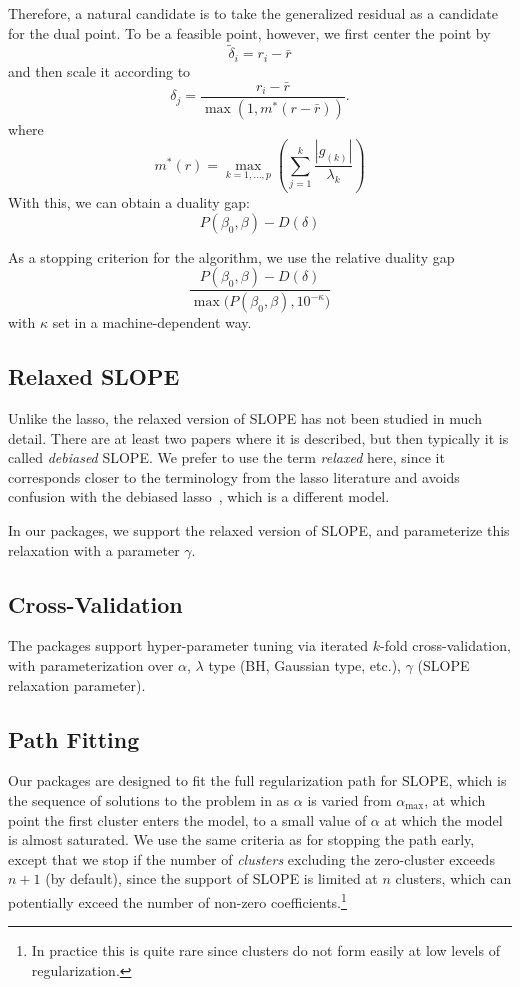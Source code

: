 \documentclass[article]{jss}
\let\Cref\crtCref
\begin{document}
Therefore, a natural candidate is to take the generalized residual as
a candidate for the dual point. To be a feasible point, however, we first
center the point by
\[
  \tilde{\delta}_i  = r_i - \bar{r}
\]
and then scale it according to
\[
  \delta_j = \frac{r_i - \bar{r}}{\max\left(1, m^*(r - \bar{r}) \right)}.
\]
where
\[
  m^*(r) = \max_{k=1,\ldots,p} \left(\sum_{j = 1}^k \frac{|g_{(k)}|}{\lambda_k} \right)
\]
With this, we can obtain a duality gap:
\[
  P(\beta_0, \beta) - D(\delta)
\]

As a stopping criterion for the algorithm, we use the relative duality gap
\[
  \frac{P(\beta_0, \beta) - D(\delta)}{\max\big(P(\beta_0, \beta), 10^{-\kappa}\big)}
\]
with \(\kappa\) set in a machine-dependent way.

\subsection{Relaxed SLOPE}

Unlike the lasso, the relaxed version of SLOPE has not been studied in much detail.
There are at least two papers where it is described, but then typically it is
called \emph{debiased} SLOPE. We prefer to use the term \emph{relaxed} here,
since it corresponds closer to the terminology from the lasso literature and
avoids confusion with the debiased lasso~\citep{geer2014}, which is a different
model.

In our packages, we support the relaxed version of SLOPE, and parameterize
this relaxation with a parameter \(\gamma\).

\subsection{Cross-Validation}

The packages support hyper-parameter tuning via iterated \(k\)-fold
cross-validation, with parameterization over \(\alpha\), \(\lambda\) type (BH,
Gaussian type, etc.), \(\gamma\) (SLOPE relaxation parameter).

\subsection{Path Fitting}

Our packages are designed to fit the full regularization path for SLOPE, which
is the sequence of solutions to the problem in \Cref{eq:slope} as \(\alpha\) is varied
from \(\alpha_\text{max}\), at which point the first cluster enters the model,
to a small value of \(\alpha\) at which the model is almost saturated.
We use the same criteria as \citet{friedman2010} for stopping the path early,
except that we stop if the number of \emph{clusters} excluding the zero-cluster
exceeds \(n + 1\) (by default), since the support of SLOPE is limited at \(n\) clusters,
which can potentially exceed the number of non-zero coefficients.\footnote{In practice
  this is quite rare since clusters do not form easily at low levels of regularization.}
\end{document}
